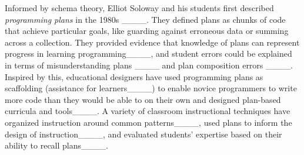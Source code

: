 Informed by schema theory, Elliot Soloway and his students first described \emph{programming plans} in the 1980s ____. They defined plans as chunks of code that achieve particular goals, like guarding against erroneous data or summing across a collection. 
They provided evidence that knowledge of plans can represent progress in learning programming____, and student errors could be explained in terms of misunderstanding plans ____ and plan composition errors ____. 
Inspired by this, educational designers have used programming plans as scaffolding (assistance for learners____) to enable novice programmers to write more code than they would be able to on their own and designed plan-based curricula and tools____. 
A variety of classroom instructional techniques have organized instruction around common patterns____, used plans to inform the design of instruction____, and evaluated students' expertise based on their ability to recall plans____.

